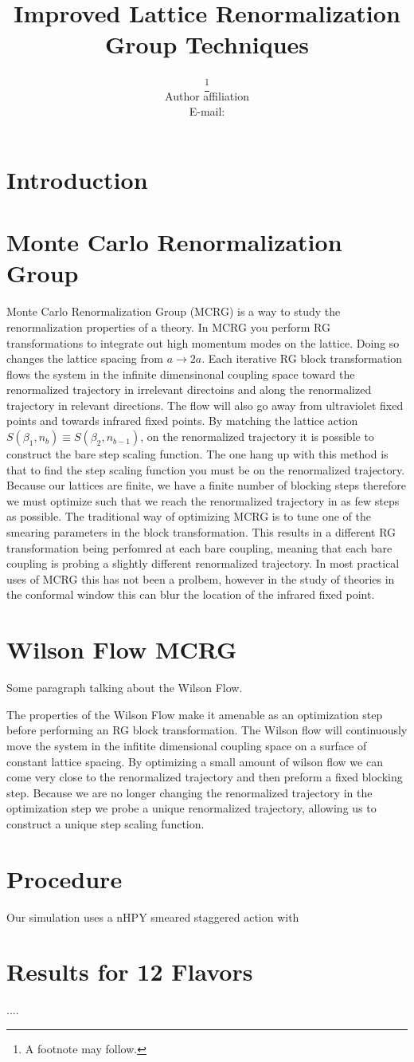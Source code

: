 \documentclass{PoS}
\title{Improved Lattice Renormalization Group Techniques}
\author{\speaker{First Author}\thanks{A footnote may follow.}\\
        Author affiliation\\
        E-mail: \email{author@email}}
\begin{document}
\section{Introduction}

\section{Monte Carlo Renormalization Group}
Monte Carlo Renormalization Group (MCRG) is a way to study the renormalization properties of a theory.
In MCRG you perform RG transformations to integrate out high momentum modes on the lattice.
Doing so changes the lattice spacing from $a \rightarrow 2a$.
Each iterative RG block transformation flows the system in the infinite dimensinonal coupling space toward the renormalized trajectory in irrelevant directoins and along the renormalized trajectory in relevant directions.
The flow will also go away from ultraviolet fixed points and towards infrared fixed points.
By matching the lattice action $S(\beta_1,n_b) \equiv S(\beta_2,n_{b-1})$, on the renormalized trajectory it is possible to construct the bare step scaling function.
The one hang up with this method is that to find the step scaling function you must be on the renormalized trajectory.
Because our lattices are finite, we have a finite number of blocking steps therefore we must optimize such that we reach the renormalized trajectory in as few steps as possible.
The traditional way of optimizing MCRG is to tune one of the smearing parameters in the block transformation.
This results in a different RG transformation being perfomred at each bare coupling, meaning that each bare coupling is probing a slightly different renormalized trajectory.
In most practical uses of MCRG this has not been a prolbem, however in the study of theories in the conformal window this can blur the location of the infrared fixed point.


\section{Wilson Flow MCRG}
Some paragraph talking about the Wilson Flow.

The properties of the Wilson Flow make it amenable as an optimization step before performing an RG block transformation.
The Wilson flow will continuously move the system in the infitite dimensional coupling space on a surface of constant lattice spacing.
By optimizing a small amount of wilson flow we can come very close to the renormalized trajectory and then preform a fixed blocking step.
Because we are no longer changing the renormalized trajectory in the optimization step we probe a unique renormalized trajectory, allowing us to construct a unique step scaling function.

\section{Procedure}
Our simulation uses a nHPY smeared staggered action with 


\section{Results for 12 Flavors}

\begin{thebibliography}{99}
....

\end{thebibliography}
\end{document}
